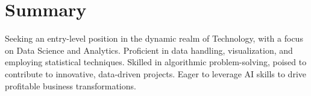 \documentclass[letterpaper,11pt]{article}
\begin{document}
\section{Summary}
\small{Seeking an entry-level position in the dynamic realm of Technology, with a focus on Data Science and Analytics. Proficient in data handling, visualization, and employing statistical techniques. Skilled in algorithmic problem-solving, poised to contribute to innovative, data-driven projects. Eager to leverage AI skills to drive profitable business transformations.}

\end{document}
